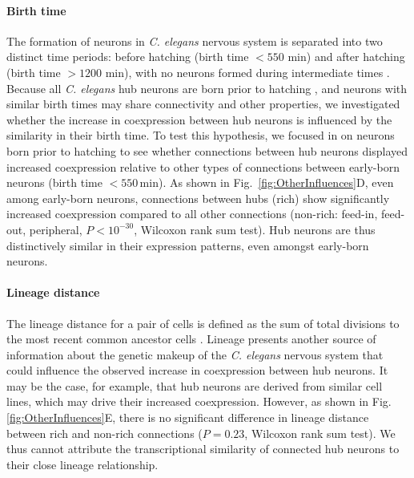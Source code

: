 \documentclass[10pt,letterpaper]{article}
\begin{document}
\paragraph{Birth time}
The formation of neurons in \textit{C. elegans} nervous system is separated into two distinct time periods: before hatching (birth time $<550$ min) and after hatching (birth time $>1200$ min), with no neurons formed during intermediate times \cite{Varier2011}.
Because all \emph{C. elegans} hub neurons are born prior to hatching \cite{Varier2011, Towlson2013}, and neurons with similar birth times may share connectivity and other properties, we investigated whether the increase in coexpression between hub neurons is influenced by the similarity in their birth time.
To test this hypothesis, we focused in on neurons born prior to hatching to see whether connections between hub neurons displayed increased coexpression relative to other types of connections between early-born neurons (birth time $<550$\,min).
As shown in Fig.~\ref{fig:OtherInfluences}D, even among early-born neurons, connections between hubs (rich) show significantly increased coexpression compared to all other connections (non-rich: feed-in, feed-out, peripheral, $P < 10^{-30}$, Wilcoxon rank sum test). 
Hub neurons are thus distinctively similar in their expression patterns, even amongst early-born neurons.

\paragraph{Lineage distance}
The lineage distance for a pair of cells is defined as the sum of total divisions to the most recent common ancestor cells \cite{Pavlovic:2014gx, Sulston1977, Sulston1983}.
Lineage presents another source of information about the genetic makeup of the \textit{C. elegans} nervous system that could influence the observed increase in coexpression between hub neurons.
It may be the case, for example, that hub neurons are derived from similar cell lines, which may drive their increased coexpression.
However, as shown in Fig.\ref{fig:OtherInfluences}E, there is no significant difference in lineage distance between rich and non-rich connections ($P = 0.23$, Wilcoxon rank sum test).
We thus cannot attribute the transcriptional similarity of connected hub neurons to their close lineage relationship.
\end{document}
